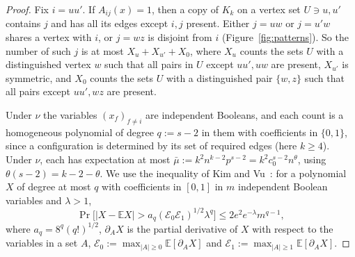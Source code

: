 \documentclass[11pt]{article}
\theoremstyle{remark}
\newcommand{\E}{\mathbb{E}}
\newcommand{\abs}[1]{\lvert #1\rvert}
\begin{document}
\begin{proof}
Fix $i=uu'$. If $A_{ij}(x)=1$, then a copy of $K_k$ on a vertex set $U\ni u,u'$ contains $j$ and has all its edges except $i,j$ present. Either $j=uw$ or $j=u'w$ shares a vertex with $i$, or $j=wz$ is disjoint from $i$ (Figure~\ref{fig:patterns}). So the number of such $j$ is at most $X_u+X_{u'}+X_0$, where $X_u$ counts the sets $U$ with a distinguished vertex $w$ such that all pairs in $U$ except $uu',uw$ are present, $X_{u'}$ is symmetric, and $X_0$ counts the sets $U$ with a distinguished pair $\{w,z\}$ such that all pairs except $uu',wz$ are present.

Under $\nu$ the variables $(x_f)_{f\ne i}$ are independent Booleans, and each count is a homogeneous polynomial of degree $q:=s-2$ in them with coefficients in $\{0,1\}$, since a configuration is determined by its set of required edges (here $k\ge4$). Under $\nu$, each has expectation at most $\bar\mu:=k^2n^{k-2}p^{s-2}=k^2c_0^{s-2}n^\theta$, using $\theta(s-2)=k-2-\theta$. We use the inequality of Kim and Vu~\cite{KV00}: for a polynomial $X$ of degree at most $q$ with coefficients in $[0,1]$ in $m$ independent Boolean variables and $\lambda>1$,
\[\Pr\bigl[\abs{X-\E X}>a_q(\mathcal E_0\mathcal E_1)^{1/2}\lambda^q\bigr]\le2e^2e^{-\lambda}m^{q-1},\]
where $a_q=8^q(q!)^{1/2}$, $\partial_AX$ is the partial derivative of $X$ with respect to the variables in a set $A$, $\mathcal E_0:=\max_{\abs A\ge0}\E[\partial_AX]$ and $\mathcal E_1:=\max_{\abs A\ge1}\E[\partial_AX]$.


\end{proof}
\end{document}
